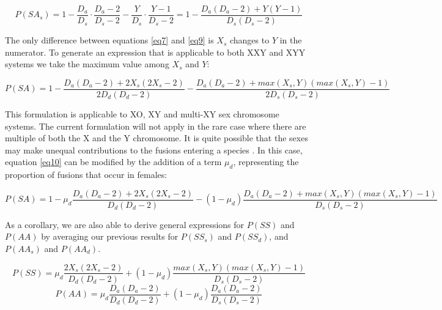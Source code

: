 \documentclass[12pt]{article}
\begin{document}
    \begin{equation} \label{eq9}
        P(SA_s) = 1 - \frac{D_a}{D_s} \cdot \frac{D_a - 2}{D_s - 2} - \frac{Y}{D_s} \cdot \frac{Y - 1}{D_s - 2} = 1 - \frac{D_a(D_a - 2) + Y(Y - 1)}{D_s(D_s - 2)}
    \end{equation}
    
The only difference between equations \ref{eq7} and \ref{eq9} is $X_s$ changes to $Y$ in the numerator. 
To generate an expression that is applicable to both XXY and XYY systems we take the maximum value among $X_s$ and $Y$:

    \begin{equation} \label{eq10}
        P(SA) = 1 -\frac{D_a(D_a-2) + 2X_s(2X_s-2)}{2D_d(D_d-2)} - \frac{D_a(D_a - 2) + max(X_s,Y)(max(X_s,Y)-1)}{2D_s(D_s-2)}
    \end{equation}

This formulation is applicable to XO, XY and multi-XY sex chromosome systems.
The current formulation will not apply in the rare case where there are multiple of both the X and the Y chromosome.
It is quite possible that the sexes may make unequal contributions to the fusions entering a species \citep{pennell2015}.
In this case, equation \ref{eq10} can be modified by the addition of a term $\mu_d$, representing the proportion of fusions that occur in females:

\small
    \begin{equation} \label{eq11}
        P(SA) = 1 -\mu_d\frac{D_a(D_a-2) + 2X_s(2X_s-2)}{D_d(D_d-2)} - (1-\mu_d)\frac{D_a(D_a - 2) + max(X_s,Y)(max(X_s,Y)-1)}{D_s(D_s-2)}
    \end{equation}
\normalsize

As a corollary, we are also able to derive general expressions for $P(SS)$ and $P(AA)$ by averaging our previous results for $P(SS_s)$ and $P(SS_d)$, and $P(AA_s)$ and $P(AA_d)$.

\begin{equation} \label{eq12}
    P(SS) = \mu_d\frac{2X_s(2X_s - 2)}{D_d(D_d-2)} + (1-\mu_d)\frac{max(X_s,Y)(max(X_s,Y) - 1)}{D_s(D_s-2)}
\end{equation}
\begin{equation} \label{eq13}
    P(AA) = \mu_d\frac{D_a(D_a-2)}{D_d(D_d-2)} + (1-\mu_d)\frac{D_a(D_a-2)}{D_s(D_s-2)}
\end{equation}
\end{document}
